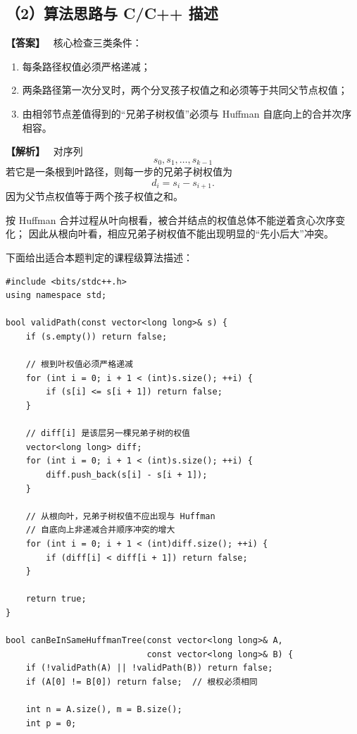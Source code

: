 \documentclass[12pt,a4paper]{ctexart}
\newenvironment{solution}
{\par\noindent\textbf{\color{answerblue}【解析】}\ }
{\par}
\newenvironment{answer}
{\par\noindent\textbf{\color{darkgreen}【答案】}\ }
{\par}
\begin{document}
\subsection*{（2）算法思路与 C/C++ 描述}

\begin{answer}
核心检查三类条件：
\begin{enumerate}
  \item 每条路径权值必须严格递减；
  \item 两条路径第一次分叉时，两个分叉孩子权值之和必须等于共同父节点权值；
  \item 由相邻节点差值得到的“兄弟子树权值”必须与 Huffman 自底向上的合并次序相容。
\end{enumerate}
\end{answer}

\begin{solution}
对序列
\[
s_0,s_1,\dots,s_{k-1}
\]
若它是一条根到叶路径，则每一步的兄弟子树权值为
\[
d_i=s_i-s_{i+1}.
\]
因为父节点权值等于两个孩子权值之和。

按 Huffman 合并过程从叶向根看，被合并结点的权值总体不能逆着贪心次序变化；
因此从根向叶看，相应兄弟子树权值不能出现明显的“先小后大”冲突。

下面给出适合本题判定的课程级算法描述：

\begin{lstlisting}
#include <bits/stdc++.h>
using namespace std;

bool validPath(const vector<long long>& s) {
    if (s.empty()) return false;

    // 根到叶权值必须严格递减
    for (int i = 0; i + 1 < (int)s.size(); ++i) {
        if (s[i] <= s[i + 1]) return false;
    }

    // diff[i] 是该层另一棵兄弟子树的权值
    vector<long long> diff;
    for (int i = 0; i + 1 < (int)s.size(); ++i) {
        diff.push_back(s[i] - s[i + 1]);
    }

    // 从根向叶，兄弟子树权值不应出现与 Huffman
    // 自底向上非递减合并顺序冲突的增大
    for (int i = 0; i + 1 < (int)diff.size(); ++i) {
        if (diff[i] < diff[i + 1]) return false;
    }

    return true;
}

bool canBeInSameHuffmanTree(const vector<long long>& A,
                            const vector<long long>& B) {
    if (!validPath(A) || !validPath(B)) return false;
    if (A[0] != B[0]) return false;  // 根权必须相同

    int n = A.size(), m = B.size();
    int p = 0;


\end{lstlisting}
\end{solution}
\end{document}
